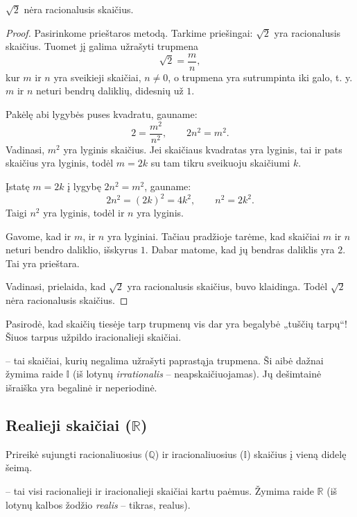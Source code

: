 \documentclass[11pt,a4paper]{scrartcl}
\begin{document}
\begin{proposition}
$\sqrt{2}$ nėra racionalusis skaičius.
\end{proposition}

\begin{proof}
Pasirinkome prieštaros metodą. Tarkime priešingai: $\sqrt{2}$ yra racionalusis skaičius. Tuomet jį galima užrašyti trupmena
\[
\sqrt{2}=\frac{m}{n},
\]
kur $m$ ir $n$ yra sveikieji skaičiai, $n\neq 0$, o trupmena yra sutrumpinta iki galo, t. y. $m$ ir $n$ neturi bendrų daliklių, didesnių už $1$.

Pakėlę abi lygybės puses kvadratu, gauname:
\[
2=\frac{m^2}{n^2},
\qquad 2n^2=m^2.
\]
Vadinasi, $m^2$ yra lyginis skaičius. Jei skaičiaus kvadratas yra lyginis, tai ir pats skaičius yra lyginis, todėl $m=2k$ su tam tikru sveikuoju skaičiumi $k$.

Įstatę $m=2k$ į lygybę $2n^2=m^2$, gauname:
\[
2n^2=(2k)^2=4k^2,
\qquad n^2=2k^2.
\]
Taigi $n^2$ yra lyginis, todėl ir $n$ yra lyginis.

Gavome, kad ir $m$, ir $n$ yra lyginiai. Tačiau pradžioje tarėme, kad skaičiai $m$ ir $n$ neturi bendro daliklio, išskyrus $1$. Dabar matome, kad jų bendras daliklis yra $2$. Tai yra prieštara.

Vadinasi, prielaida, kad $\sqrt{2}$ yra racionalusis skaičius, buvo klaidinga. Todėl $\sqrt{2}$ nėra racionalusis skaičius.
\end{proof}

Pasirodė, kad skaičių tiesėje tarp trupmenų vis dar yra begalybė „tuščių tarpų“! Šiuos tarpus užpildo iracionalieji skaičiai.

\begin{definition}
 -- tai skaičiai, kurių negalima užrašyti paprastąja trupmena. Ši aibė dažnai žymima raide $\mathbb{I}$ (iš lotynų \textit{irrationalis} --  neapskaičiuojamas). Jų dešimtainė išraiška yra begalinė ir neperiodinė.
\end{definition}

\subsection{Realieji skaičiai ($\mathbb{R}$)}

Prireikė sujungti racionaliuosius ($\mathbb{Q}$) ir iracionaliuosius ($\mathbb{I}$) skaičius į vieną didelę šeimą.

\begin{definition}
 -- tai visi racionalieji ir iracionalieji skaičiai kartu paėmus. Žymima raide $\mathbb{R}$ (iš lotynų kalbos žodžio \textit{realis} -- tikras, realus). 
\end{definition}
\end{document}
